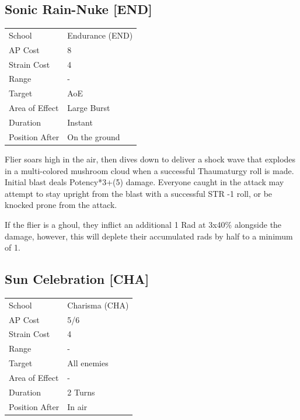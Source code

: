 \documentclass[11pt,a4paper,twocolumn]{book}
\begin{document}
\subsection*{Sonic Rain-Nuke [END]}
{
	\begin{tabu} to 75mm{| X[l,4] | X[l,7] |}
		\hline
		School 			& Endurance (END) 	\\
        AP Cost	      	& 8 				\\
        Strain Cost     & 4 				\\
        Range     		& - 				\\
        Target      	& AoE 				\\
        Area of Effect  & Large Burst 	 	\\
        Duration     	& Instant 	 		\\
		Position After  & On the ground 	\\ \hline
	\end{tabu}
		
}

\medskip

Flier soars high in the air, then dives down to deliver a shock wave that explodes in a multi-colored mushroom cloud when a successful Thaumaturgy roll is made.
Initial blast deals Potency*3+(5) damage. Everyone caught in the attack may attempt to stay upright from the blast with a successful STR -1 roll, or be knocked prone from the attack.

If the flier is a ghoul, they inflict an additional 1 Rad at 3x40\% alongside the damage, however, this will deplete their accumulated rads by half to a minimum of 1.


\subsection*{Sun Celebration [CHA]}
{
	\begin{tabu} to 75mm{| X[l,4] | X[l,7] |}
		\hline
		School 			& Charisma (CHA) 	\\
        AP Cost	      	& 5/6 				\\
        Strain Cost     & 4 				\\
        Range     		& - 				\\
        Target      	& All enemies 		\\
        Area of Effect  & - 	 			\\
        Duration     	& 2 Turns 	 		\\
		Position After  & In air 			\\ \hline
	\end{tabu}
		
}
\end{document}

